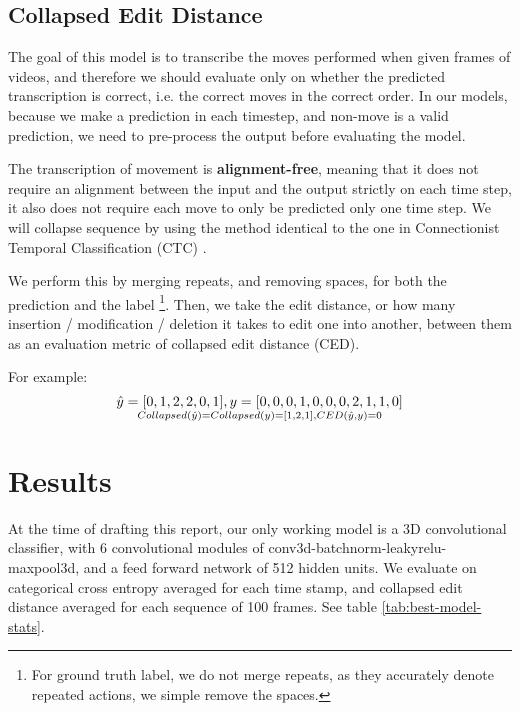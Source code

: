 \documentclass[10pt,twocolumn,letterpaper]{article}
\begin{document}
\subsection{Collapsed Edit Distance}

The goal of this model is to transcribe the moves performed when given frames of videos, and therefore we should evaluate only on whether the predicted transcription is correct, i.e. the correct moves in the correct order. In our models, because we make a prediction in each timestep, and non-move is a valid prediction, we need to pre-process the output before evaluating the model.

The transcription of movement is \textbf{alignment-free}, meaning that it does not require an alignment between the input and the output strictly on each time step, it also does not require each move to only be predicted only one time step. We will collapse sequence by using the method identical to the one in Connectionist Temporal Classification (CTC) \cite{10.1016/j.neunet.2005.06.042}.

We perform this by merging repeats, and removing spaces, for both the prediction and the label \footnote{For ground truth label, we do not merge repeats, as they accurately denote repeated actions, we simple remove the spaces.}. Then, we take the edit distance, or how many insertion / modification / deletion it takes to edit one into another, between them as an evaluation metric of collapsed edit distance (CED).

For example:
\[
\hat{y} = [0,1,2,2,0,1], y = [0,0,0,1,0,0,0,2,1,1,0]
\atop 
Collapsed(\hat{y}) = Collapsed(y) = [1,2,1], 
CED(\hat{y}, y) = 0
\]


\section{Results}


At the time of drafting this report, our only working model is a 3D convolutional classifier, with 6 convolutional modules of conv3d-batchnorm-leakyrelu-maxpool3d, and a feed forward network of 512 hidden units. We evaluate on categorical cross entropy averaged for each time stamp, and collapsed edit distance averaged for each sequence of 100 frames. See table \ref{tab:best-model-stats}.
\end{document}
